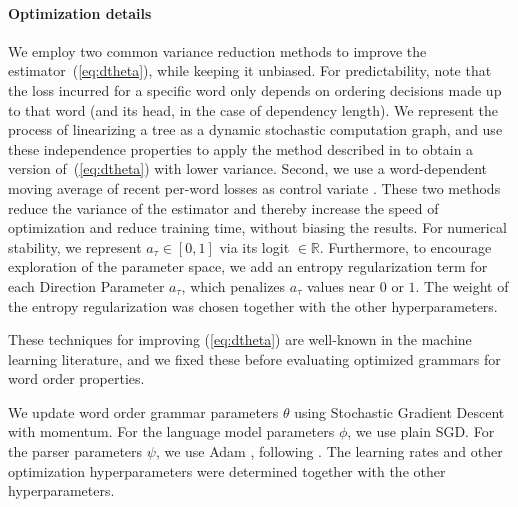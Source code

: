 \documentclass[10pt,twoside,lineno]{article}
\begin{document}
%    

\paragraph{Optimization details}

We employ two common variance reduction methods to improve the estimator~(\ref{eq:dtheta}), while keeping it unbiased.
For predictability, note that the loss incurred for a specific word only depends on ordering decisions made up to that word (and its head, in the case of dependency length). We represent the process of linearizing a tree as a dynamic stochastic computation graph, and use these independence properties to apply the method described in \citet{schulman2015gradient} to obtain a version of~(\ref{eq:dtheta}) with lower variance.
Second, we use a word-dependent moving average of recent per-word losses as control variate \cite{williams1992simple}.
These two methods reduce the variance of the estimator and thereby increase the speed of optimization and reduce training time, without biasing the results.
For numerical stability, we represent $a_\tau \in [0,1]$ via its logit $\in \mathbb{R}$.
Furthermore, to encourage exploration of the parameter space, we add an entropy regularization term \citep{xu2015show} for each Direction Parameter $a_\tau$, which penalizes $a_\tau$ values near $0$ or $1$. The weight of the entropy regularization was chosen together with the other hyperparameters.


These techniques for improving (\ref{eq:dtheta}) are well-known in the machine learning literature, and we fixed these before evaluating optimized grammars for word order properties.

We update word order grammar parameters $\theta$ using Stochastic Gradient Descent with momentum.
For the language model parameters $\phi$, we use plain SGD. 
For the parser parameters $\psi$, we use Adam \citep{kingma2014adam}, following \citet{dozat2017stanford}.
The learning rates and other optimization hyperparameters were determined together with the other hyperparameters.
\end{document}
